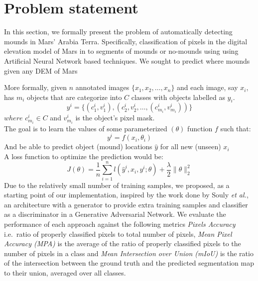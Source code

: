 \documentclass[sigconf,natbib=false]{acmart}
\begin{document}
\section{Problem statement}
In this section, we formally present the problem of automatically detecting
mounds in Mars' Arabia Terra. Specifically, classification of pixels in the
digital elevation model of Mars in to segments of mounds or no-mounds using
using Artificial Neural Network based techniques. We sought to predict where
mounds given any DEM of Mars\par
More formally, given $n$ annotated images $\lbrace x_{1},x_{2},\ldots,x_{n}
\rbrace$ and each image, say $x_{i}$, has $m_{i}$ objects that are categorize
into $C$ classes with objects labelled as $y_{i}$.
\begin{equation}
    y^{i} = \lbrace (c^{i}_{1},v^{i}_{1}), (c^{i}_{2},v^{i}_{2}, \ldots,
    (c^{i}_{m_{i}},v^{i}_{m_{i}})) \rbrace
\end{equation}
\hspace{2em} {$where$} $c^{i}_{m_{i}}\in C$ and $v^{i}_{m_{i}}$ is the object's
pixel mask.\\
The goal is to learn the values of some parameterized $(\theta)$ function $f$
such that:
\begin{equation}
    y^{i} = f(x_{i},\theta_{i})
\end{equation}
And be able to predict object (mound) locations $\hat{y}$ for all new (unseen)
$x_{i}$\\
A loss function to optimize the prediction would be:
\begin{equation}
    J(\theta) = \dfrac{1}{n}\sum_{i=1}^{n}l(\hat{y}^{i},x_{i},y^{i};\theta) +
    \dfrac{\lambda}{2}\| \theta \|^{2}_{2}
\end{equation}
Due to the relatively small number of training samples, we proposed, as a
starting point of our implementation, inspired by the work done by Souly
\textit{et al.}\cite{8237868}, an architecture with a generator to provide extra
training samples and classifier as a discriminator in a Generative Adversarial
Network. We evaluate the performance of each approach against the following
metrics \textit{Pixels Accuracy} i.e.~ratio of properly classified pixels to
total number of pixels, \textit{Mean Pixel Accuracy (MPA)} is the average of the
ratio of properly classified pixels to the number of pixels in a class and
\textit{Mean Intersection over Union (mIoU)} is the ratio of the intersection
between the ground truth and the predicted segmentation map to their union,
averaged over all classes.
\end{document}
